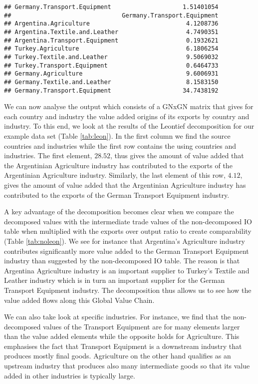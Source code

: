 \documentclass{article}\usepackage[]{graphicx}\usepackage[]{color}
\makeatletter
\newenvironment{kframe}{%
 \def\at@end@of@kframe{}%
 \ifinner\ifhmode%
  \def\at@end@of@kframe{\end{minipage}}%
  \begin{minipage}{\columnwidth}%
 \fi\fi%
 \def\FrameCommand##1{\hskip\@totalleftmargin \hskip-\fboxsep
 \colorbox{shadecolor}{##1}\hskip-\fboxsep
     \hskip-\linewidth \hskip-\@totalleftmargin \hskip\columnwidth}%
 \MakeFramed {\advance\hsize-\width
   \@totalleftmargin\z@ \linewidth\hsize
   \@setminipage}}%
 {\par\unskip\endMakeFramed%
 \at@end@of@kframe}
\newenvironment{knitrout}{}{} %
\makeatother
\begin{document}
\begin{knitrout}
\begin{kframe}
\begin{verbatim}
## Germany.Transport.Equipment                    1.51401054
##                               Germany.Transport.Equipment
## Argentina.Agriculture                           4.1208736
## Argentina.Textile.and.Leather                   4.7490351
## Argentina.Transport.Equipment                   0.1932621
## Turkey.Agriculture                              6.1806254
## Turkey.Textile.and.Leather                      9.5069032
## Turkey.Transport.Equipment                      0.6464733
## Germany.Agriculture                             9.6006931
## Germany.Textile.and.Leather                     8.1583150
## Germany.Transport.Equipment                    34.7438192
\end{verbatim}
\end{kframe}
\end{knitrout}

We can now analyse the output which consists of a GNxGN matrix that gives for each country and industry the value added origins of its exports by country and industry. To this end, we look at the results of the Leontief decomposition for our example data set (Table \ref{tab:leon}). In the first column we find the source countries and industries while the first row contains the using countries and industries. The first element, $28.52$, thus gives the amount of value added that the Argentinian Agriculture industry has contributed to the exports of the Argentinian Agriculture industry. Similarly, the last element of this row, $4.12$, gives the amount of value added that the Argentinian Agriculture industry has contributed to the exports of the German Transport Equipment industry.

A key advantage of the decomposition becomes clear when we compare the decomposed values with the intermediate trade values of the non-decomposed IO table when multiplied with the exports over output ratio to create comparability (Table \ref{tab:noleon}). We see for instance that Argentina's Agriculture industry contributes significantly more value added to the German Transport Equipment industry than suggested by the non-decomposed IO table. The reason is that Argentina Agriculture industry is an important supplier to Turkey's Textile and Leather industry which is in turn an important supplier for the German Transport Equipment industry. The decomposition thus allows us to see how the value added flows along this Global Value Chain.

We can also take look at specific industries. For instance, we find that the non-decomposed values of the Transport Equipment are for many elements larger than the value added elements while the opposite holds for Agriculture. This emphasises the fact that Transport Equipment is a downstream industry that produces mostly final goods. Agriculture on the other hand qualifies as an upstream industry that produces also many intermediate goods so that its value added in other industries is typically large.
\end{document}
